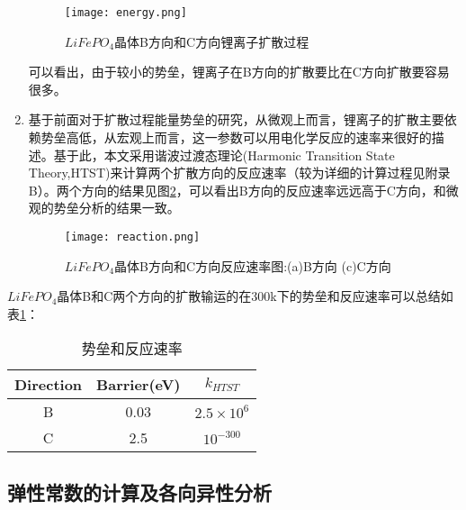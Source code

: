 \begin{enumerate}
	\begin{figure}
	\centering   
	\texttt{[image: energy.png]}
	\caption{$LiFePO_4$晶体B方向和C方向锂离子扩散过程} 
	\label{fig:energy}
	\end{figure}
	可以看出，由于较小的势垒，锂离子在B方向的扩散要比在C方向扩散要容易很多。
	\item 基于前面对于扩散过程能量势垒的研究，从微观上而言，锂离子的扩散主要依赖势垒高低，从宏观上而言，这一参数可以用电化学反应的速率来很好的描述。基于此，本文采用谐波过渡态理论(Harmonic Transition State Theory,HTST)来计算两个扩散方向的反应速率\cite{Vineyard1957Frequency,Eyring1935The,Voter1984Transition}（较为详细的计算过程见附录B）。两个方向的结果见图\ref{fig:reaction}，可以看出B方向的反应速率远远高于C方向，和微观的势垒分析的结果一致。
	\begin{figure}
	\centering   
	\texttt{[image: reaction.png]}
	\caption{$LiFePO_4$晶体B方向和C方向反应速率图:(a)B方向 (c)C方向} 
	\label{fig:reaction}
	\end{figure}
\end{enumerate}
$LiFePO_4$晶体B和C两个方向的扩散输运的在300k下的势垒和反应速率可以总结如表\ref{tab:HTST}：
\begin{table}
	\centering
	\caption{势垒和反应速率}
    \label{tab:HTST}
    \begin{tabular}{ | c | c | c | }
    \hline
    \hline
    Direction & Barrier(eV) & $k_{HTST}$\\ \hline \hline
    B & 0.03 & $2.5 \times 10^6$\\
    C & 2.5 & $10^{-300}$ \\
    \hline
    \hline
    \end{tabular}
\end{table}
\subsection{弹性常数的计算及各向异性分析}
